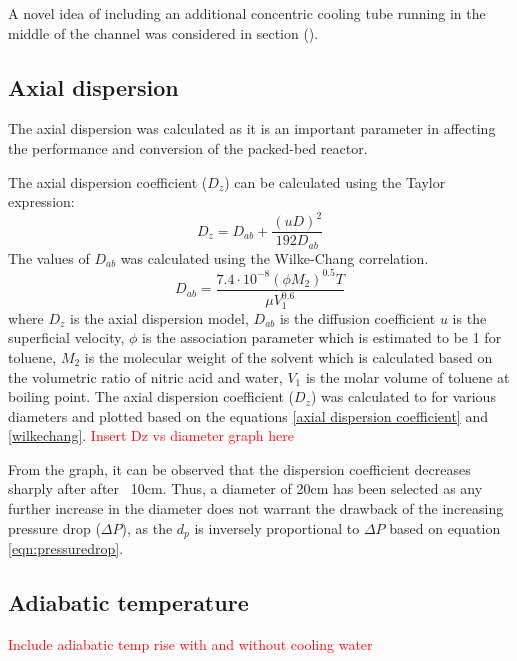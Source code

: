 A novel idea of including an additional concentric cooling tube running in the middle of the channel was considered in section (). %





\subsection{Axial dispersion}
\label{sec:axialdispersion}
The axial dispersion was calculated as it is an important parameter in affecting the performance and conversion of the packed-bed reactor. 

The axial dispersion coefficient ($D_z$) can be calculated using the Taylor expression: 
\begin{equation}
    D_z=D_{ab}+\frac{(uD)^2}{192D_{ab}}
    \label{axial dispersion coefficient}
\end{equation}
The values of $D_{ab}$ was calculated using the Wilke-Chang correlation.
\begin{equation}
    D_{ab}=\frac{7.4\cdot 10^{-8}(\phi M_2)^{0.5}T}{\mu V_1^{0.6}}
    \label{wilkechang}
\end{equation}
where $D_z$ is the axial dispersion model, $D_{ab}$ is the diffusion coefficient $u$ is the superficial velocity, $\phi$ is the association parameter which is estimated to be 1 for toluene, $M_2$ is the molecular weight of the solvent which is calculated based on the volumetric ratio of nitric acid and water, $V_1$ is the molar volume of toluene at boiling point.
The axial dispersion coefficient ($D_z$) was calculated to for various diameters and plotted based on the equations \ref{axial dispersion coefficient} and \ref{wilkechang}.
\textcolor{red}{Insert Dz vs diameter graph here} 


From the graph, it can be observed that the dispersion coefficient decreases sharply after after ~10cm. Thus, a diameter of 20cm has been selected as any further increase in the diameter does not warrant the drawback of the increasing pressure drop ($\Delta P$), as the $d_p$ is inversely proportional to $\Delta P$ based on equation \ref{eqn:pressuredrop}.
\subsection{Adiabatic temperature}

\textcolor{red}{Include adiabatic temp rise with and without cooling water}

